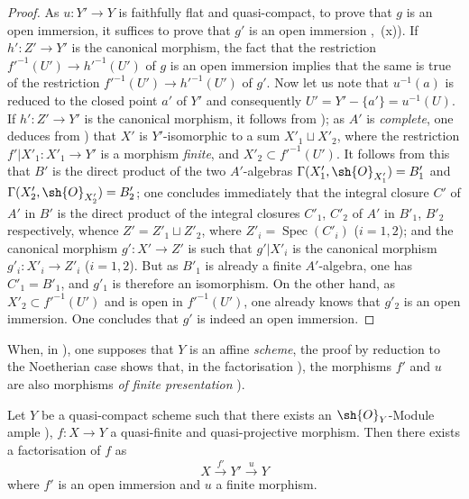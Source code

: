 \begin{proof}
As $u:Y'\to Y$ is faithfully flat and quasi-compact, to prove that $g$ is an open immersion, it suffices to prove that $g'$ is an open immersion ,~(x)).
If $h':Z'\to Y'$ is the canonical morphism, the fact that the restriction $f'^{-1}(U')\to h'^{-1}(U')$ of $g$ is an open immersion implies that the same is true of the restriction $f'^{-1}(U')\to h'^{-1}(U')$ of $g'$.
Now let us note that $u^{-1}(a)$ is reduced to the closed point $a'$ of $Y'$ and consequently $U'=Y'-\{a'\}=u^{-1}(U)$.
If $h':Z'\to Y'$ is the canonical morphism, it follows from ); as $A'$ is \emph{complete}, one deduces from ) that $X'$ is $Y'$-isomorphic to a sum $X'_1\sqcup X'_2$, where the restriction $f'|X'_1:X'_1\to Y'$ is a morphism \emph{finite}, and $X'_2\subset f'^{-1}(U')$.
It follows from this that $B'$ is the direct product of the two $A'$-algebras $\Gamma(X'_1,\sh{O}_{X'_1})=B'_1$ and $\Gamma(X'_2,\sh{O}_{X'_2})=B'_2$; one concludes immediately that the integral closure $C'$ of $A'$ in $B'$ is the direct product of the integral closures $C'_1$, $C'_2$ of $A'$ in $B'_1$, $B'_2$ respectively, whence $Z'=Z'_1\sqcup Z'_2$, where $Z'_i=\operatorname{Spec}(C'_i)$ ($i=1,2$); and the canonical morphism $g':X'\to Z'$ is such that $g'|X'_i$ is the canonical morphism $g'_i:X'_i\to Z'_i$ ($i=1,2$).
But as $B'_1$ is already a finite $A'$-algebra, one has $C'_1=B'_1$, and $g'_1$ is therefore an isomorphism.
On the other hand, as $X'_2\subset f'^{-1}(U')$ and is open in $f'^{-1}(U')$, one
already knows that $g'_2$ is an open immersion.
One concludes that $g'$ is indeed an open immersion.
\end{proof}

\begin{remark}[8.12.7]
\label{IV.8.12.7}
When, in ), one supposes that $Y$ is an affine \emph{scheme}, the proof by reduction to the Noetherian case shows that, in the factorisation ), the morphisms $f'$ and $u$ are also morphisms \emph{of finite presentation} ).
\end{remark}

\begin{corollary}[8.12.8]
\label{IV.8.12.8}
Let $Y$ be a quasi-compact scheme such that there exists an $\sh{O}_Y$-Module ample ), $f:X\to Y$ a quasi-finite and quasi-projective morphism.
Then there exists a factorisation of $f$ as
\[
X\xrightarrow{f'}Y'\xrightarrow{u}Y
\]
where $f'$ is an open immersion and $u$ a finite morphism.
\end{corollary}

